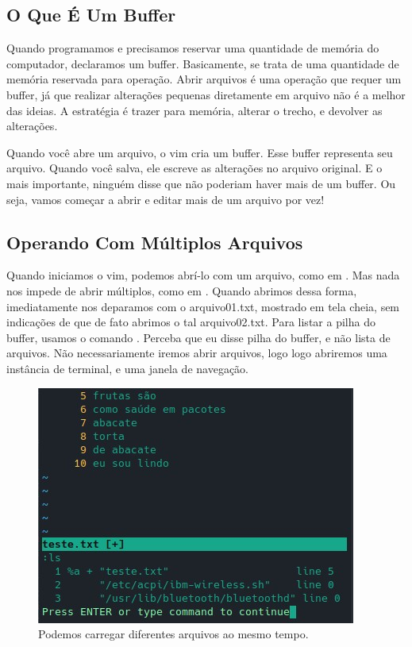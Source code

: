 \subsection{O Que É Um Buffer}
Quando programamos e precisamos reservar uma quantidade de memória do computador, declaramos um buffer.
Basicamente, se trata de uma quantidade de memória reservada para operação.
Abrir arquivos é uma operação que requer um buffer, já que realizar alterações pequenas diretamente em arquivo
não é a melhor das ideias.
A estratégia é trazer para memória, alterar o trecho, e devolver as alterações.

Quando você abre um arquivo, o vim cria um buffer.
Esse buffer representa seu arquivo.
Quando você salva, ele escreve as alterações no arquivo original.
E o mais importante, ninguém disse que não poderiam haver mais de um buffer.
Ou seja, vamos começar a abrir e editar mais de um arquivo por vez!

\subsection{Operando Com Múltiplos Arquivos}
Quando iniciamos o vim, podemos abrí-lo com um arquivo, como em .
Mas nada nos impede de abrir múltiplos, como em .
Quando abrimos dessa forma, imediatamente nos deparamos com o arquivo01.txt, mostrado em tela cheia,
sem indicações de que de fato abrimos o tal arquivo02.txt.
Para listar a pilha do buffer, usamos o comando .
Perceba que eu disse pilha do buffer, e não lista de arquivos.
Não necessariamente iremos abrir arquivos, logo logo abriremos uma instância de terminal, e uma janela de navegação.

\begin{figure}[!htb]
\centering
\includegraphics[scale=0.95]{recursos_avancados/Badd_ls.jpg}
\caption{Podemos carregar diferentes arquivos ao mesmo tempo.}
\end{figure}

